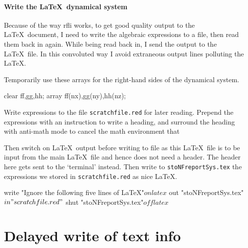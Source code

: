 \documentclass[11pt,a5paper]{article}
\begin{document}
\paragraph{Write the \LaTeX\ dynamical system}

Because of the way rfli works, to get good quality output to
the \LaTeX\ document, I need to write the algebraic
expressions to a file, then read them back in again. While
being read back in, I send the output to the \LaTeX\ file.
In this convoluted way I avoid extraneous output lines
polluting the \LaTeX. 

Temporarily use these arrays for the right-hand sides of the
dynamical system.
\begin{reduce}
clear ff,gg,hh;
array ff(nx),gg(ny),hh(nz);
\end{reduce}

Write expressions to the file \verb|scratchfile.red| for
later reading. Prepend the expressions with an instruction
to write a heading, and surround the heading with anti-math
mode to cancel the math environment that 

Then switch on \LaTeX\ output before writing to file as this
\LaTeX\ file is to be input from the main \LaTeX\ file and
hence does not need a header. The header here gets sent to
the `terminal' instead. Then write to
\verb|stoNFreportSys.tex| the expressions we stored in
\verb|scratchfile.red| as nice \LaTeX.
\begin{reduce}
write "Ignore the following five lines of LaTeX"$
on latex$
out "stoNFreportSys.tex"$
in "scratchfile.red"$
shut "stoNFreportSys.tex"$
off latex$
\end{reduce}



\section{Delayed write of text info}
\label{sec:dwti}
\end{document}
